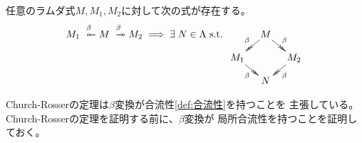 {	\begin{proposition}
	\label{prop:Church-Rosserの定理} %
		任意のラムダ式$M,M_1,M_2$に対して次の式が存在する。
		\begin{equation*}\begin{split}
			M_1 \xfromfrom{\beta} M \xtoto{\beta} M_2
			\implies \exists\; N\in\Lambda \text{ s.t. } \xymatrix@R=1em@C=1em{
				& M \ar@{>>}[dl]_\beta \ar@{>>}[dr]^\beta \\
				M_1 \ar@{>>}[dr]_\beta & & M_2 \ar@{>>}[dl]^\beta \\
				& N
			}
		\end{split}\end{equation*}
	\end{proposition} %

	Church-Rosserの定理は$\beta$変換が合流性\ref{def:合流性}を持つことを
	主張している。Church-Rosserの定理を証明する前に、$\beta$変換が
	局所合流性を持つことを証明しておく。

}

